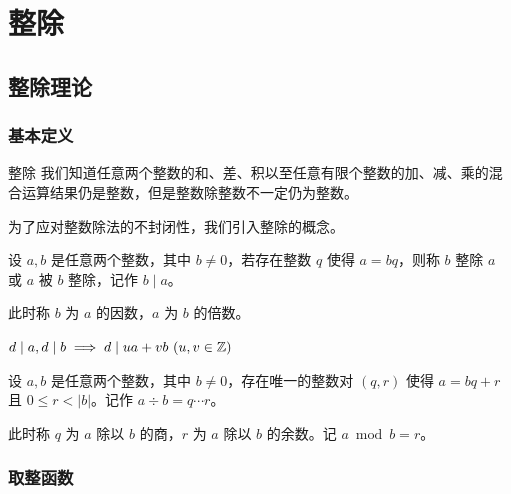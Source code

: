 \documentclass[../main.tex]{subfiles}
\begin{document}
\section{整除}

\subsection{整除理论}

\subsubsection{基本定义}

\begin{frame}{整除}
我们知道任意两个整数的和、差、积以至任意有限个整数的加、减、乘的混合运算结果仍是整数，但是整数除整数不一定仍为整数。\pause

\medskip
为了应对整数除法的不封闭性，我们引入整除的概念。
\end{frame}

\begin{frame}
\begin{defi}[整除]
设 $a,b$ 是任意两个整数，其中 $b\neq 0$，若存在整数 $q$ 使得 $a=bq$，则称 $b$ 整除 $a$ 或 $a$ 被 $b$ 整除，记作 $b\mid a$。
\end{defi} \pause

此时称 $b$ 为 $a$ 的因数，$a$ 为 $b$ 的倍数。 \pause

\medskip
\begin{theo}
$d\mid a,d\mid b\implies d\mid ua+vb\ (u,v\in\Z)$
\end{theo}
\end{frame}

\begin{frame}
\begin{defi}[带余除法]
设 $a,b$ 是任意两个整数，其中 $b\neq 0$，存在唯一的整数对 $(q,r)$ 使得 $a=bq+r$ 且 $0\le r<|b|$。记作 $a\div b=q\cdots r$。
\end{defi} \pause

此时称 $q$ 为 $a$ 除以 $b$ 的商，$r$ 为 $a$ 除以 $b$ 的余数。记 $a\bmod b=r$。
\end{frame}

\subsubsection{取整函数}
\end{document}
